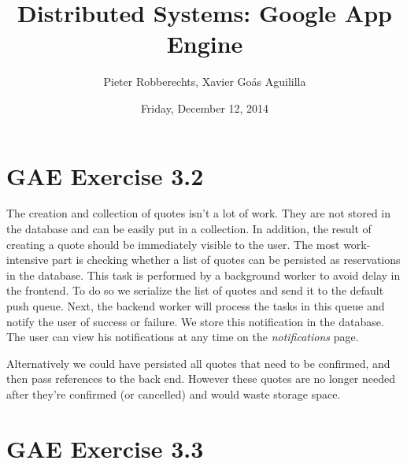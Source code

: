 \documentclass[11pt]{article}
\author{Pieter Robberechts, Xavier Goás Aguililla}
\date{Friday, December 12, 2014}
\title{Distributed Systems: Google App Engine}
\begin{document}
\maketitle

\section*{GAE Exercise 3.2}



The creation and collection of quotes isn't a lot of work. They are
not stored in the database and can be easily put in a collection.  In
addition, the result of creating a quote should be immediately visible
to the user. The most work-intensive part is checking whether a list
of quotes can be persisted as reservations in the database. This task
is performed by a background worker to avoid delay in the frontend. To
do so we serialize the list of quotes and send it to the default push
queue. Next, the backend worker will process the tasks in this queue
and notify the user of success or failure. We store this notification
in the database. The user can view his notifications at any time on
the \textit{notifications} page.

Alternatively we could have persisted all quotes that need to be
confirmed, and then pass references to the back end. However these
quotes are no longer needed after they’re confirmed (or cancelled) and
would waste storage space.

\section*{GAE Exercise 3.3}

\end{document}
